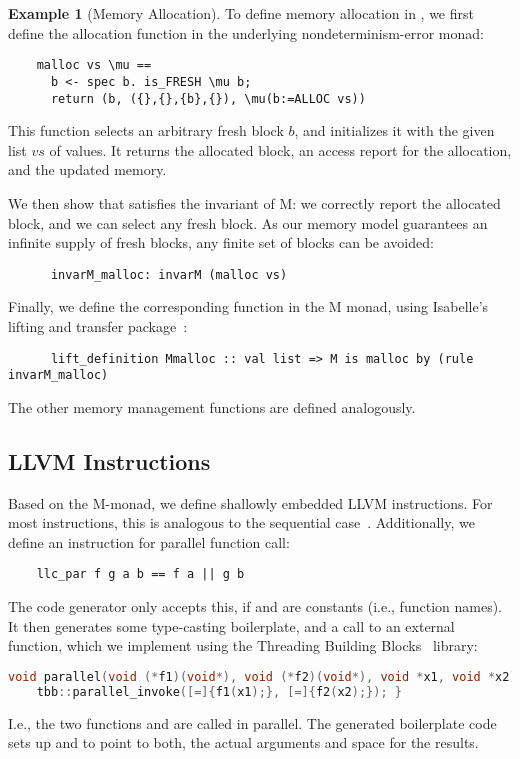 \documentclass[sn-mathphys,Numbered]{sn-jnl}
\theoremstyle{thmstyleone}%
\theoremstyle{definition}%
\newtheorem{example}{Example}%
\theoremstyle{thmstylethree}%
\begin{document}
  \begin{example}[{Memory Allocation}]
    To define memory allocation in , we first define the allocation function in the underlying nondeterminism-error monad:
    \begin{lstlisting}
    malloc vs \mu ==
      b <- spec b. is_FRESH \mu b;
      return (b, ({},{},{b},{}), \mu(b:=ALLOC vs))
    \end{lstlisting}
    This function selects an arbitrary fresh block \is$b$, and initializes it with the given list \is$vs$ of values.
    It returns the allocated block, an access report for the allocation, and the updated memory.

    We then show that  satisfies the invariant of M: we correctly report the allocated block,
    and we can select any fresh block. As our memory model guarantees an infinite supply of fresh blocks,
    any finite set of blocks can be avoided:
    \begin{lstlisting}
      invarM_malloc: invarM (malloc vs)
    \end{lstlisting}

    Finally, we define the corresponding function in the M monad, using Isabelle's lifting and transfer package~\cite{HuKu13}:
    \begin{lstlisting}
      lift_definition Mmalloc :: val list => M is malloc by (rule invarM_malloc)
    \end{lstlisting}
    The other memory management functions are defined analogously.
  \end{example}

  \subsection{LLVM Instructions}
  Based on the M-monad, we define shallowly embedded LLVM instructions. For most instructions,
  this is analogous to the sequential case~\cite{La19-llvm}.
  Additionally, we define an instruction for parallel function call:
  \begin{lstlisting}
    llc_par f g a b == f a || g b
  \end{lstlisting}
  The code generator only accepts this, if  and  are constants (i.e., function names).
  It then generates some type-casting boilerplate, and a call to an external
   function, which we implement using the Threading Building Blocks~\cite{TBB} library:
  \begin{lstlisting}[language=C++]
  void parallel(void (*f1)(void*), void (*f2)(void*), void *x1, void *x2) {
    tbb::parallel_invoke([=]{f1(x1);}, [=]{f2(x2);}); }
  \end{lstlisting}
  I.e., the two functions  and  are called in parallel. The generated boilerplate code sets up  and  to point to both, the actual arguments and space for the results.
\end{document}
